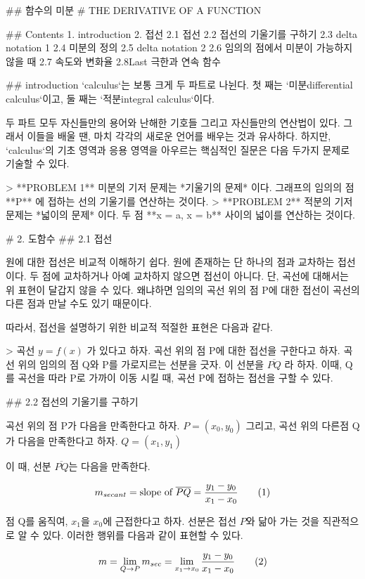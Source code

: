 ## 함수의 미분 
# THE DERIVATIVE OF A FUNCTION 

## Contents
1. introduction  
2. 접선  
2.1 접선  
2.2 접선의 기울기를 구하기   
2.3 delta notation 1  
2.4 미분의 정의   
2.5 delta notation 2  
2.6 임의의 점에서 미분이 가능하지 않을 때  
2.7 속도와 변화율  
2.8Last 극한과 연속 함수  

## introduction  
`calculus`는 보통 크게 두 파트로 나뉜다. 첫 째는 `미분differential calculus`이고, 둘 째는 `적분integral calculus`이다.  

두 파트 모두 자신들만의 용어와 난해한 기호들 그리고 자신들만의 연산법이 있다. 그래서 이들을 배울 땐, 마치 각각의 새로운 언어를 배우는 것과 유사하다.  
하지만, `calculus`의 기초 영역과 응용 영역을 아우르는 핵심적인 질문은 다음 두가지 문제로 기술할 수 있다.

> **PROBLEM 1** 미분의 기저 문제는 *기울기의 문제* 이다. 그래프의 임의의 점 **P** 에 접하는 선의 기울기를 연산하는 것이다.  
> **PROBLEM 2** 적분의 기저 문제는 *넓이의 문제* 이다. 두 점 **x = a, x = b** 사이의 넓이를 연산하는 것이다.  

# 2. 도함수 
## 2.1 접선

원에 대한 접선은 비교적 이해하기 쉽다. 원에 존재하는 단 하나의 점과 교차하는 접선이다. 두 점에 교차하거나 아예 교차하지 않으면 접선이 아니다.  
단, 곡선에 대해서는 위 표현이 달갑지 않을 수 있다. 왜냐하면 임의의 곡선 위의 점 P에 대한 접선이 곡선의 다른 점과 만날 수도 있기 때문이다.  

따라서, 접선을 설명하기 위한 비교적 적절한 표현은 다음과 같다.  

> 곡선 $y = f(x)$ 가 있다고 하자. 곡선 위의 점 P에 대한 접선을 구한다고 하자. 곡선 위의 임의의 점 Q와 P를 가로지르는 선분을 긋자. 이 선분을 $\overline{PQ}$ 라 하자. 이때, Q를 곡선을 따라 P로 가까이 이동 시킬 때, 곡선 P에 접하는 접선을 구할 수 있다.  

## 2.2 접선의 기울기를 구하기  

곡선 위의 점 P가 다음을 만족한다고 하자. $P=(x_0,y_0)$    
그리고, 곡선 위의 다른점 Q가 다음을 만족한다고 하자. $Q=(x_1,y_1)$  

이 때, 선분 $\overline{PQ}$는 다음을 만족한다.  

$$m_{secant} = \text{slope of }\overline{PQ} = \frac{y_1-y_0}{x_1-x_0}\tag1$$

점 Q를 움직여, $x_1$을 $x_0$에 근접한다고 하자. 선분은 접선 $P$와 닮아 가는 것을 직관적으로 알 수 있다. 이러한 행위를 다음과 같이 표현할 수 있다.

$$m = \lim_{Q \to P} m_{sec} = \lim_{x_1 \to x_0} \frac{y_1 - y_0}{x_1 - x_0}\tag2$$  

